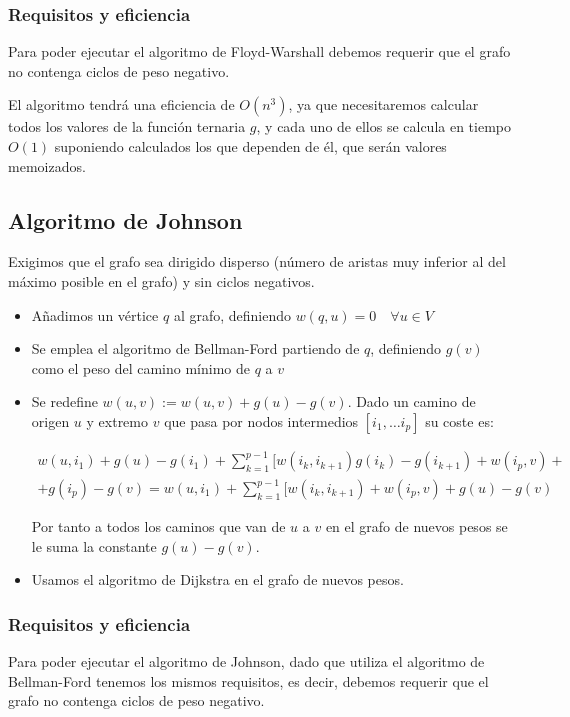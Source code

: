 \documentclass[a4paper, 11pt]{article} %
\begin{document}
    \subsubsection{Requisitos y eficiencia}
      Para poder ejecutar el algoritmo de Floyd-Warshall debemos requerir que el grafo
      no contenga ciclos de peso negativo.
      
      El algoritmo tendrá una eficiencia de $O(n^3)$, ya que necesitaremos calcular
      todos los valores de la función ternaria $g$, y cada uno de ellos se calcula
      en tiempo $O(1)$ suponiendo calculados los que dependen de él, que serán valores
      memoizados.
  
  \subsection{Algoritmo de Johnson}
      Exigimos que el grafo sea dirigido disperso (número de aristas muy inferior al del
      máximo posible en el grafo) y sin ciclos negativos.
      
      
    \begin{itemize}
      \item Añadimos un vértice $q$ al grafo, definiendo $w(q,u) = 0 \quad \forall u \in V$
      \item Se emplea el algoritmo de Bellman-Ford partiendo de $q$, definiendo
	$g(v)$ como el peso del camino mínimo de $q$ a $v$
      \item Se redefine $w(u,v):=w(u,v) + g(u)-g(v)$. Dado un camino de origen $u$ y
	extremo $v$ que pasa por nodos intermedios $[i_1,\ldots i_p]$ su coste es:
	
	\begin{eqnarray*}
	w(u,i_1) + g(u) -g(i_1) + \sum_{k=1}^{p-1} [w(i_{k},i_{k+1}) g(i_k) - g(i_{k+1}) + w(i_p,v) + \\
	+ g(i_p)- g(v) = w(u,i_1) + \sum_{k=1}^{p-1} [w(i_{k},i_{k+1}) + w(i_p,v) + g(u) - g(v)
	\end{eqnarray*}
	
	Por tanto a todos los caminos que van de $u$ a $v$ en el grafo de nuevos pesos
	se le suma la constante $g(u) - g(v)$.
      \item Usamos el algoritmo de Dijkstra en el grafo de nuevos pesos.
    \end{itemize}
    
      \subsubsection{Requisitos y eficiencia}
	Para poder ejecutar el algoritmo de Johnson, dado que utiliza el algoritmo de Bellman-Ford tenemos los mismos 
	requisitos, es decir, debemos requerir que el grafo no contenga ciclos de peso negativo.
	
\end{document}
